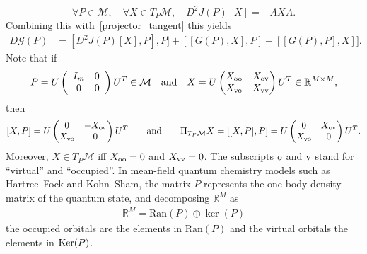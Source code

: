 \documentclass{article}
\def\R{\mathbb R}
\newcommand{\1}{{\mathds 1}}
\begin{document}
$$
\forall P \in \mathcal M, \quad \forall X \in T_P\mathcal M, \quad D^2J(P)[X]=-AXA.
$$
Combining this with~\eqref{projector_tangent} this yields
\begin{align} \label{eq:DGtilde}
D\mathcal G(P) &= [D^2J(P)[X],P],P] + [[G(P), X],P] + [[G(P),P],X]].
\end{align}
Note that if 
$$
P = 
U \left( \begin{array}{cc} I_m & 0 \\ 0 & 0 \end{array} \right)U^T \in \mathcal M 
\quad \mbox{and} \quad 
X = 
U \begin{pmatrix} X_{\rm oo} & X_{\rm ov} \\ X_{\rm vo} &  X_{\rm vv} \end{pmatrix} U^T \in \R^{M \times M},
$$
then 
\begin{align} 
\label{eq:proj_TPM}
[X,P] 
=
U \begin{pmatrix} 0 & -X_{\rm ov} \\ X_{\rm vo} & 0\end{pmatrix} U^T 
\qquad {\rm and} \qquad  
\Pi_{T_P\mathcal M} X 
= [[X,P],P] 
= U \begin{pmatrix} 0 & X_{\rm ov} \\ X_{\rm vo} & 0 \end{pmatrix} U^T.
\end{align}
Moreover, $X \in T_P\mathcal M$ iff $X_{\rm oo}= 0$ and $X_{\rm vv}=0$.
The subscripts $\rm o$ and $\rm v$ stand for ``virtual'' and ``occupied''. In mean-field quantum chemistry models such as Hartree--Fock and Kohn--Sham,  the matrix $P$ represents the one-body density matrix  of the quantum state, and decomposing $\mathbb R^M$ as
   \begin{align*}
        \mathbb{R}^{M} = \mathrm{Ran}(P) \oplus \ker(P)
    \end{align*}
    the occupied orbitals are the elements in $\mathrm{Ran}(P)$ and the virtual orbitals the elements in ${\rm Ker}(P)$. 
\end{document}
